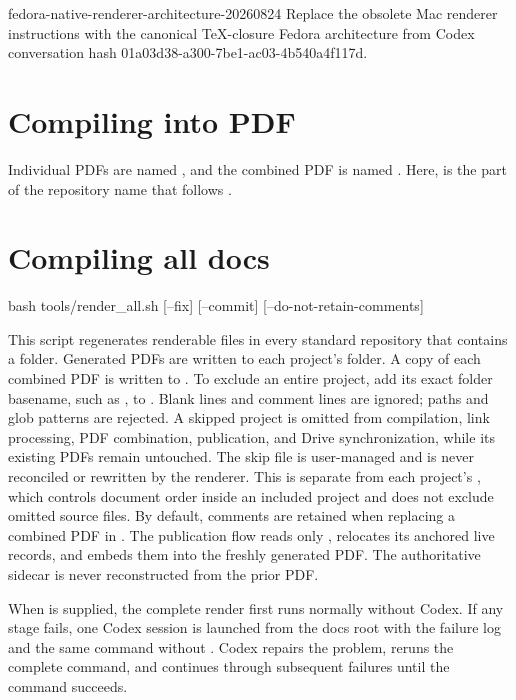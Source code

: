\agentProposedEdit
  {fedora-native-renderer-architecture-20260824}
  {Replace the obsolete Mac renderer instructions with the canonical TeX-closure Fedora architecture from Codex conversation hash 01a03d38-a300-7be1-ac03-4b540a4f117d.}
  {\section*{Compiling into PDF}
Individual PDFs are named , and the combined PDF is named .
Here,  is the part of the repository name that follows .

\section*{Compiling all docs}
\begin{DocCode}
  bash tools/render_all.sh [--fix] [--commit] [--do-not-retain-comments]
\end{DocCode}
This script regenerates renderable files in every standard  repository that contains a  folder.
Generated PDFs are written to each project's  folder.
A copy of each combined PDF is written to .
To exclude an entire project, add its exact folder basename, such as , to .
Blank lines and comment lines are ignored; paths and glob patterns are rejected.
A skipped project is omitted from compilation, link processing, PDF combination,  publication, and Drive synchronization, while its existing PDFs remain untouched.
The skip file is user-managed and is never reconciled or rewritten by the renderer.
This is separate from each project's , which controls document order inside an included project and does not exclude omitted source files.
By default, comments are retained when replacing a combined PDF in .
The publication flow reads only , relocates its anchored live records, and embeds them into the freshly generated PDF.
The authoritative sidecar is never reconstructed from the prior PDF.

When  is supplied, the complete render first runs normally without Codex.
If any stage fails, one Codex session is launched from the docs root with the failure log and the same command without .
Codex repairs the problem, reruns the complete command, and continues through subsequent failures until the command succeeds.}
